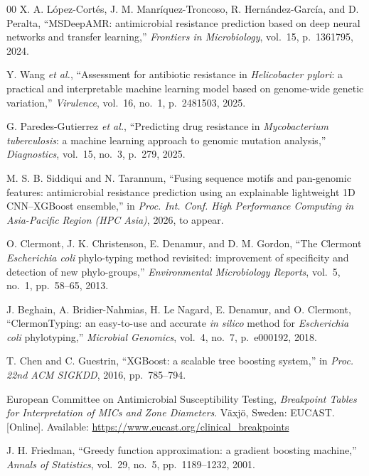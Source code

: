 \documentclass[journal]{IEEEtran}
\begin{document}
\begin{thebibliography}{00}
 X. A. L\'{o}pez-Cort\'{e}s, J. M. Manr\'{i}quez-Troncoso, R. Hern\'{a}ndez-Garc\'{i}a, and D. Peralta, ``MSDeepAMR: antimicrobial resistance prediction based on deep neural networks and transfer learning,'' \textit{Frontiers in Microbiology}, vol.~15, p.~1361795, 2024.

 Y. Wang \textit{et al.}, ``Assessment for antibiotic resistance in \textit{Helicobacter pylori}: a practical and interpretable machine learning model based on genome-wide genetic variation,'' \textit{Virulence}, vol.~16, no.~1, p.~2481503, 2025.

 G. Paredes-Gutierrez \textit{et al.}, ``Predicting drug resistance in \textit{Mycobacterium tuberculosis}: a machine learning approach to genomic mutation analysis,'' \textit{Diagnostics}, vol.~15, no.~3, p.~279, 2025.

 M. S. B. Siddiqui and N. Tarannum, ``Fusing sequence motifs and pan-genomic features: antimicrobial resistance prediction using an explainable lightweight 1D CNN--XGBoost ensemble,'' in \textit{Proc. Int. Conf. High Performance Computing in Asia-Pacific Region (HPC Asia)}, 2026, to appear.

 O. Clermont, J. K. Christenson, E. Denamur, and D. M. Gordon, ``The Clermont \textit{Escherichia coli} phylo-typing method revisited: improvement of specificity and detection of new phylo-groups,'' \textit{Environmental Microbiology Reports}, vol.~5, no.~1, pp.~58--65, 2013.

 J. Beghain, A. Bridier-Nahmias, H. Le Nagard, E. Denamur, and O. Clermont, ``ClermonTyping: an easy-to-use and accurate \textit{in silico} method for \textit{Escherichia coli} phylotyping,'' \textit{Microbial Genomics}, vol.~4, no.~7, p.~e000192, 2018.

 T. Chen and C. Guestrin, ``XGBoost: a scalable tree boosting system,'' in \textit{Proc. 22nd ACM SIGKDD}, 2016, pp.~785--794.

 European Committee on Antimicrobial Susceptibility Testing, \textit{Breakpoint Tables for Interpretation of MICs and Zone Diameters}. V\"{a}xj\"{o}, Sweden: EUCAST. [Online]. Available: \url{https://www.eucast.org/clinical_breakpoints}

 J. H. Friedman, ``Greedy function approximation: a gradient boosting machine,'' \textit{Annals of Statistics}, vol.~29, no.~5, pp.~1189--1232, 2001.


\end{thebibliography}
\end{document}
